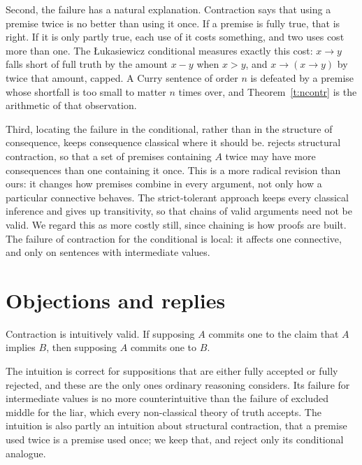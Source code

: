 \documentclass{situationist-preprint}
\begin{document}
Second, the failure has a natural explanation. Contraction says that using a premise twice is no better than using it once. If a premise is fully true, that is right. If it is only partly true, each use of it costs something, and two uses cost more than one. The Łukasiewicz conditional measures exactly this cost: $x \to y$ falls short of full truth by the amount $x - y$ when $x > y$, and $x \to (x \to y)$ by twice that amount, capped. A Curry sentence of order $n$ is defeated by a premise whose shortfall is too small to matter $n$ times over, and Theorem~\ref{t:ncontr} is the arithmetic of that observation.

Third, locating the failure in the conditional, rather than in the structure of consequence, keeps consequence classical where it should be. \citet{Zardini2011} rejects structural contraction, so that a set of premises containing $A$ twice may have more consequences than one containing it once. This is a more radical revision than ours: it changes how premises combine in every argument, not only how a particular connective behaves. The strict-tolerant approach \citep{CobrerosEtAl2013,Ripley2013} keeps every classical inference and gives up transitivity, so that chains of valid arguments need not be valid. We regard this as more costly still, since chaining is how proofs are built. The failure of contraction for the conditional is local: it affects one connective, and only on sentences with intermediate values.

\section{Objections and replies}\label{s:obj}

\begin{objection}
Contraction is intuitively valid. If supposing $A$ commits one to the claim that $A$ implies $B$, then supposing $A$ commits one to $B$.
\end{objection}

\begin{reply}
The intuition is correct for suppositions that are either fully accepted or fully rejected, and these are the only ones ordinary reasoning considers. Its failure for intermediate values is no more counterintuitive than the failure of excluded middle for the liar, which every non-classical theory of truth accepts. The intuition is also partly an intuition about structural contraction, that a premise used twice is a premise used once; we keep that, and reject only its conditional analogue.
\end{reply}
\end{document}
